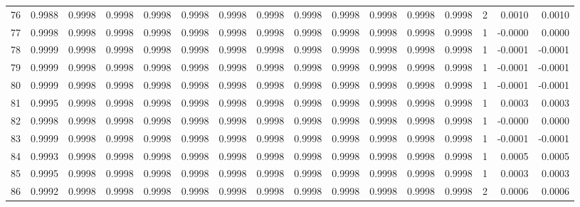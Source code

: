 \begin{tabular}{lrrrrrrrrrrrrrrr}
76  &      0.9988 &  0.9998 &  0.9998 &  0.9998 &  0.9998 &  0.9998 &  0.9998 &  0.9998 &  0.9998 &  0.9998 &   0.9998 &     0.9998 &      2 &                    0.0010 &                     0.0010 \\
77  &      0.9998 &  0.9998 &  0.9998 &  0.9998 &  0.9998 &  0.9998 &  0.9998 &  0.9998 &  0.9998 &  0.9998 &   0.9998 &     0.9998 &      1 &                   -0.0000 &                     0.0000 \\
78  &      0.9999 &  0.9998 &  0.9998 &  0.9998 &  0.9998 &  0.9998 &  0.9998 &  0.9998 &  0.9998 &  0.9998 &   0.9998 &     0.9998 &      1 &                   -0.0001 &                    -0.0001 \\
79  &      0.9999 &  0.9998 &  0.9998 &  0.9998 &  0.9998 &  0.9998 &  0.9998 &  0.9998 &  0.9998 &  0.9998 &   0.9998 &     0.9998 &      1 &                   -0.0001 &                    -0.0001 \\
80  &      0.9999 &  0.9998 &  0.9998 &  0.9998 &  0.9998 &  0.9998 &  0.9998 &  0.9998 &  0.9998 &  0.9998 &   0.9998 &     0.9998 &      1 &                   -0.0001 &                    -0.0001 \\
81  &      0.9995 &  0.9998 &  0.9998 &  0.9998 &  0.9998 &  0.9998 &  0.9998 &  0.9998 &  0.9998 &  0.9998 &   0.9998 &     0.9998 &      1 &                    0.0003 &                     0.0003 \\
82  &      0.9998 &  0.9998 &  0.9998 &  0.9998 &  0.9998 &  0.9998 &  0.9998 &  0.9998 &  0.9998 &  0.9998 &   0.9998 &     0.9998 &      1 &                   -0.0000 &                     0.0000 \\
83  &      0.9999 &  0.9998 &  0.9998 &  0.9998 &  0.9998 &  0.9998 &  0.9998 &  0.9998 &  0.9998 &  0.9998 &   0.9998 &     0.9998 &      1 &                   -0.0001 &                    -0.0001 \\
84  &      0.9993 &  0.9998 &  0.9998 &  0.9998 &  0.9998 &  0.9998 &  0.9998 &  0.9998 &  0.9998 &  0.9998 &   0.9998 &     0.9998 &      1 &                    0.0005 &                     0.0005 \\
85  &      0.9995 &  0.9998 &  0.9998 &  0.9998 &  0.9998 &  0.9998 &  0.9998 &  0.9998 &  0.9998 &  0.9998 &   0.9998 &     0.9998 &      1 &                    0.0003 &                     0.0003 \\
86  &      0.9992 &  0.9998 &  0.9998 &  0.9998 &  0.9998 &  0.9998 &  0.9998 &  0.9998 &  0.9998 &  0.9998 &   0.9998 &     0.9998 &      2 &                    0.0006 &                     0.0006 \\

\end{tabular}
